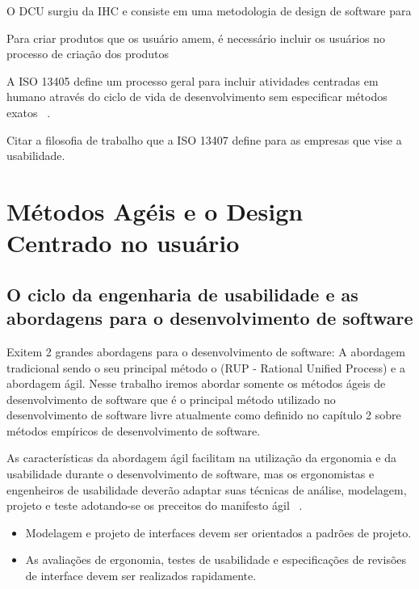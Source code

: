 O DCU surgiu da IHC e consiste em uma metodologia de design de software para 


Para criar produtos que os usuário amem, é necessário incluir os usuários no processo de criação dos produtos \cite{travis2013}

A ISO 13405 define um processo geral para incluir atividades centradas em humano através do ciclo de vida de desenvolvimento sem especificar métodos 
exatos ~\cite{santos2012}.

Citar a filosofia de trabalho que a  ISO 13407 define para as empresas que vise a usabilidade.


\section{Métodos Agéis e o Design Centrado no usuário}

\subsection{O ciclo da engenharia de usabilidade e as abordagens para o desenvolvimento de software}

	Exitem 2 grandes abordagens para o desenvolvimento de software: A abordagem tradicional sendo o seu principal método o (RUP - Rational Unified Process) e a abordagem ágil.
	Nesse trabalho iremos abordar somente os métodos ágeis de desenvolvimento de software que é o principal método utilizado no desenvolvimento de software livre atualmente como definido no capítulo 2 sobre métodos empíricos de desenvolvimento de software.

	As características da abordagem ágil facilitam na utilização da ergonomia e da usabilidade durante o desenvolvimento de software, mas os ergonomistas e engenheiros de usabilidade deverão adaptar suas técnicas de análise, modelagem, projeto e teste adotando-se os preceitos do manifesto ágil ~\cite{cybis2010}.

\begin{itemize}
\item Modelagem e projeto de interfaces devem ser orientados a padrões de projeto.
\item As avaliações de ergonomia, testes de usabilidade e especificações de revisões de interface devem ser realizados rapidamente.
\end{itemize}

